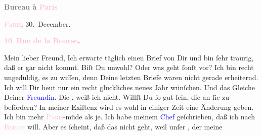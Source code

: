            \pstart
           \begin{otherlanguage}{french}\textcolor{gray}{\textbf{\textbf{Bureau à \textcolor{pink}{Paris}{}\ledrightnote{\textcolor{pink}{Paris}}}}}\end{otherlanguage}\hfill \textsc{\textcolor{pink}{Paris}{}\ledrightnote{\textcolor{pink}{Paris}}}, 30. December.\pend
           \pstart
           \begin{otherlanguage}{french}\textcolor{gray}{\textbf{\textbf{\textcolor{pink}{10 Rue de la Bourse}{}\ledrightnote{\textcolor{pink}{rue de la Bourse}}.}}}\end{otherlanguage}\pend
           \pstart\center{}Mein lieber Freund,\pend\pstart
           Ich erwarte täglich einen Brief von Dir und bin ſehr traurig, daß er gar nicht kommt.
               Biſt Du unwohl? Oder was geht ſonſt vor? Ich bin recht ungeduldig, es zu wiſſen, denn
               Deine letzten Briefe waren nicht gerade erheiternd.\pend
           \pstart
           Ich will Dir heut nur ein recht glückliches neues Jahr
               wünſchen. Und das Gleiche Deiner \textcolor{blue}{Freundin}{}.\pend
           \pstart
           Die \label{K_L02835-77v}\label{K_L02835-77h}, weiß ich nicht. Willſt Du ſo gut ſein, die \label{K_L02835-44v}\label{K_L02835-44h} an ſie zu befördern?\pend
           \pstart
           {\pb}In meiner Exiſtenz wird es wohl in
               einiger Zeit  eine Änderung geben. Ich bin mehr \textsc{\textcolor{pink}{Paris}{}\ledrightnote{\textcolor{pink}{Paris}}}\textcolor{gray}{-}müde als je. Ich habe meinem \textcolor{blue}{Chef}{} geſchrieben, daß ich nach \textsc{\textcolor{pink}{Berlin}{}\ledrightnote{\textcolor{pink}{Berlin}}} will. Aber es ſcheint, daß das nicht geht, weil unſer \label{K_L02835-12v}\label{K_L02835-12h}, der meine
